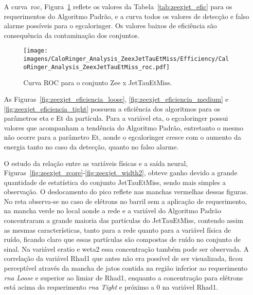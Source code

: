 A curva~\gls{roc}, Figura~\ref{fig:zeexjet_roc} reflete os valores da
Tabela~\ref{tab:zeexjet_efic} para os
requerimentos do Algoritmo Padrão, e a curva todos os valores de detecção e
falso alarme possíveis para o \gls{egcaloringer}. Os valores baixos de
eficiência são consequência da contaminação dos conjuntos.

\begin{figure}[ht]
\centering
\texttt{[image: imagens/CaloRinger\_Analysis\_ZeexJetTauEtMiss/Efficiency/CaloRinger\_Analysis\_ZeexJetTauEtMiss\_roc.pdf]}
\caption{Curva ROC para o conjunto Zee x JetTauEtMiss.}
\label{fig:zeexjet_roc}
\end{figure}

As Figuras~\ref{fig:zeexjet_eficiencia_loose},
\ref{fig:zeexjet_eficiencia_medium} e \ref{fig:zeexjet_eficiencia_tight} possuem
a eficiência dos algoritmos para os parâmetros \gls{eta} e \gls{Et} da
partícula. Para a variável \gls{eta}, o \gls{egcaloringer} possui valores que
acompanham a tendência do Algoritmo Padrão, entretanto o mesmo não ocorre para a
parâmetro \gls{Et}, aonde o \gls{egcaloringer} cresce com o aumento da energia
tanto no caso da detecção, quanto no falso alarme.

O estudo da relação entre as variáveis físicas e a saída neural,
Figuras~\ref{fig:zeexjet_rcore}-\ref{fig:zeexjet_width2}, obteve ganho
devido a grande quantidade de estatística do conjunto JetTauEtMiss, sendo mais
simples a observação. O deslocamento do pico reflete nas manchas vermelhas
dessas figuras. No \gls{reta} observa-se no caso de elétrons no barril sem a
aplicação de requerimento, na mancha verde no local aonde a rede e a variável do
Algoritmo Padrão concentraram a grande maioria das partículas do JetTauEtMiss,
contendo assim as mesmas características, tanto para a rede quanto para a
variável física de ruído, ficando claro que essas partículas são compostas de
ruído no conjunto de sinal. Na variável \gls{eratio} e \gls{weta2} essa
concentração também pode ser observada. A correlação da variável \gls{Rhad1} que
antes não era possível de ser visualizada, ficou perceptível através da mancha
de jatos contida na região inferior ao requerimento \emph{\gls{rna} Loose} e
superior ao limiar de \gls{Rhad1}, enquanto a concentração para elétrons está
acima do requerimento \emph{\gls{rna} Tight} e próximo a 0 na variável
\gls{Rhad1}.


